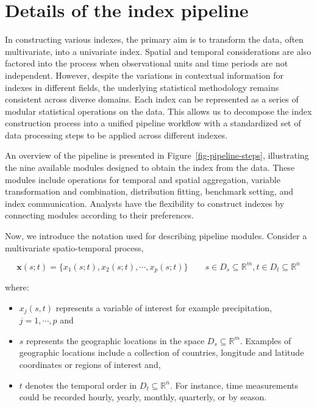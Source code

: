 \documentclass[
]{interact}
\begin{document}
\hypertarget{sec-pipeline}{%
\section{Details of the index pipeline}\label{sec-pipeline}}

In constructing various indexes, the primary aim is to transform the
data, often multivariate, into a univariate index. Spatial and temporal
considerations are also factored into the process when observational
units and time periods are not independent. However, despite the
variations in contextual information for indexes in different fields,
the underlying statistical methodology remains consistent across diverse
domains. Each index can be represented as a series of modular
statistical operations on the data. This allows us to decompose the
index construction process into a unified pipeline workflow with a
standardized set of data processing steps to be applied across different
indexes.

An overview of the pipeline is presented in
Figure~\ref{fig-pipeline-steps}, illustrating the nine available modules
designed to obtain the index from the data. These modules include
operations for temporal and spatial aggregation, variable transformation
and combination, distribution fitting, benchmark setting, and index
communication. Analysts have the flexibility to construct indexes by
connecting modules according to their preferences.

Now, we introduce the notation used for describing pipeline modules.
Consider a multivariate spatio-temporal process,

\begin{equation}
\mathbf{x}(s;t) = \{x_1(s;t), x_2(s;t), \cdots, x_p(s;t)\} \qquad s \in D_s \subseteq \mathbb{R}^m, t \in D_t \subseteq \mathbb{R}^n 
\end{equation}

where:

\begin{itemize}
\item
  \(x_j(s, t)\) represents a variable of interest for example
  precipitation, \(j = 1, \cdots, p\) and
\item
  \(s\) represents the geographic locations in the space
  \(D_s \subseteq \mathbb{R}^m\). Examples of geographic locations
  include a collection of countries, longitude and latitude coordinates
  or regions of interest and,
\item
  \(t\) denotes the temporal order in \(D_t \subseteq \mathbb{R}^n\).
  For instance, time measurements could be recorded hourly, yearly,
  monthly, quarterly, or by season.
\end{itemize}
\end{document}
